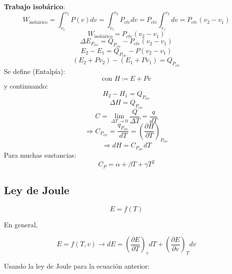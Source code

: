         \textbf{Trabajo isobárico}:
        \[W_{\text{isobárico}}=\int_{v_{1}}^{v_{2}} P(v)dv = \int_{v_{1}}^{v_{2}} P_{cte}dv=P_{cte}\int_{v_{1}}^{v_{2}} dv = P_{cte}(v_{2} - v_{1})\]
        \begin{equation}
            W_{\text{isobárico}}=P_{cte}(v_{2} - v_{1})
        \end{equation}
        \[\Delta E_{P_{cte}} = Q_{P_{cte}} - P_{cte}(v_{2}-v_{1})\]
        \[E_{2} - E_{1} = Q_{P_{cte}}-P(v_{2}-v_{1})\]
        \[\left ( E_{2} + Pv_{2} \right ) - \left ( E_{1} + Pv_{1} \right ) = Q_{P_{cte}}\]
        Se define (Entalpía):
        \begin{equation}
        \label{entalpia}
            \text{con }H\coloneqq E + Pv
        \end{equation}
        y continuando:
        \[H_{2} - H_{1} = Q_{P_{cte}}\]
        \begin{equation}
            \Delta H = Q_{P_{cte}}
        \end{equation}
        \[C = \lim_{\Delta T \rightarrow 0} \frac{Q}{\Delta T} = \frac{q}{dT}\]
        \[\Rightarrow C_{P_{cte}} = \frac{q_{P_{cte}}}{dT} = \left ( \frac{\partial H}{\partial T}\right )_{P_{cte}}\]
        \begin{equation}
        \label{entalpia_cp}
            \Rightarrow dH = C_{P_{cte}}dT
        \end{equation}
        Para muchas sustancias:
        \begin{equation}
        \label{cp_cuadratica}
            C_{P}=\alpha + \beta T + \gamma T^{2}
        \end{equation}

    \subsection{Ley de Joule}

    \begin{quote}
        \textit{}
    \end{quote}
    
    \[E=f(T)\]
    
    En general,
    
    \[E=f(T,v) \rightarrow dE = \left ( \frac{\partial E}{\partial T} \right )_{v}dT + \left ( \frac{\partial E}{\partial v} \right )_{T}dv\]
    
    Usando la ley de Joule para la ecuación anterior:
    
